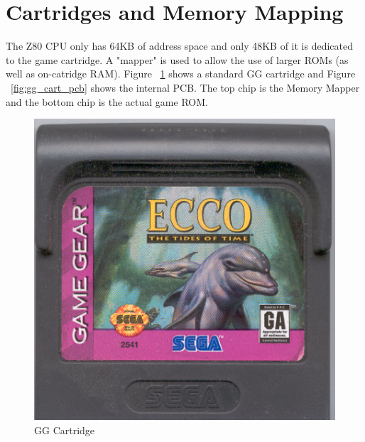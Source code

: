 \documentclass{article}
\begin{document}
\newpage
\section{Cartridges and Memory Mapping}

The Z80 CPU only has 64KB of address space and only 48KB of it is
dedicated to the game cartridge. A "mapper" is used to allow the use of
larger ROMs (as well as on-catridge RAM). Figure ~\ref{fig:gg_cart}
shows a standard GG cartridge and Figure ~\ref{fig:gg_cart_pcb} shows
the internal PCB. The top chip is the Memory Mapper and the bottom chip
is the actual game ROM.

\begin{figure}[H]
    \centering
    \begin{minipage}[H]{0.3\linewidth}
        \centering
        \includegraphics[width=\textwidth]{gg_cart.png}
        \caption{GG Cartridge\protect\cite{gg_cart}}
        \label{fig:gg_cart}
    \end{minipage}
    \hspace{1.5cm}
    \begin{minipage}[H]{0.3\linewidth}
        \centering

\end{minipage}
\end{figure}
\end{document}
